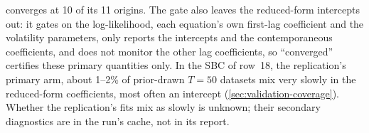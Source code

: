 converges at 10 of its 11 origins. %
The gate also leaves the reduced-form intercepts out: it gates on the log-likelihood, each
equation's own first-lag coefficient and the volatility parameters, only reports the intercepts
and the contemporaneous coefficients, and does not monitor the other lag coefficients, so
``converged'' certifies these primary quantities only. %
In the SBC of row~18, the replication's primary arm, about 1--2\% of prior-drawn $T = 50$ datasets
mix very slowly in the reduced-form coefficients, most often an intercept
(\cref{sec:validation-coverage}). Whether the replication's fits mix as slowly is unknown; their
secondary diagnostics are in the run's cache, not in its report. %

